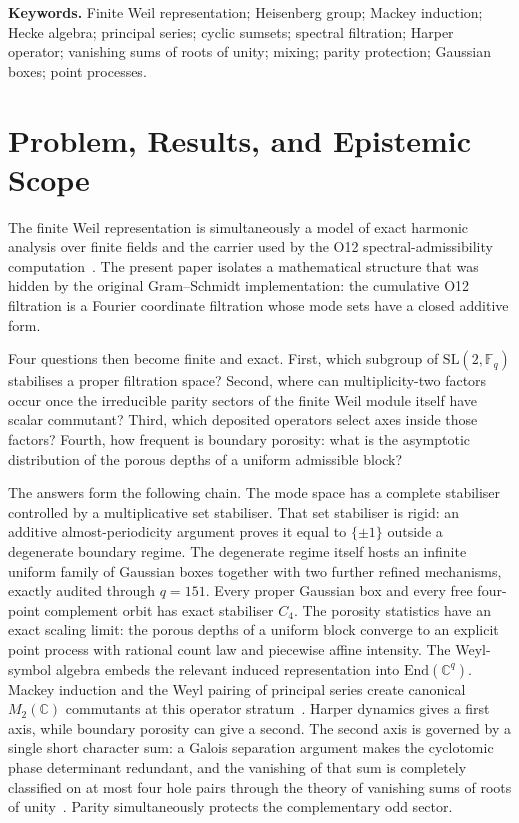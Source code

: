 \documentclass[11pt,a4paper]{article}
\theoremstyle{definition}
\theoremstyle{remark}
\newcommand{\C}{\mathbb{C}}
\newcommand{\Fq}{\mathbb{F}_q}
\newcommand{\G}{\mathrm{SL}(2,\Fq)}
\newcommand{\End}{\mathrm{End}}
\begin{document}
\noindent\textbf{Keywords.}
Finite Weil representation; Heisenberg group; Mackey induction; Hecke algebra;
principal series; cyclic sumsets; spectral filtration; Harper operator;
vanishing sums of roots of unity; mixing; parity protection; Gaussian boxes;
point processes.

\newpage
\tableofcontents

\newpage
\section{Problem, Results, and Epistemic Scope}
\label{sec:introduction}

The finite Weil representation is simultaneously a model of exact harmonic analysis over
finite fields and the carrier used by the O12 spectral-admissibility
computation~\cite{Weil1964,Gerardin1977,Beau2026a16}.
The present paper isolates a mathematical structure that was hidden by the original
Gram--Schmidt implementation: the cumulative O12 filtration is a Fourier coordinate
filtration whose mode sets have a closed additive form.

Four questions then become finite and exact.
First, which subgroup of $\G$ stabilises a proper filtration space?
Second, where can multiplicity-two factors occur once the irreducible parity sectors of the
finite Weil module itself have scalar commutant?
Third, which deposited operators select axes inside those factors?
Fourth, how frequent is boundary porosity: what is the asymptotic distribution of the
porous depths of a uniform admissible block?

The answers form the following chain.
The mode space has a complete stabiliser controlled by a multiplicative set stabiliser.
That set stabiliser is rigid: an additive almost-periodicity argument proves it equal to
$\{\pm1\}$ outside a degenerate boundary regime.
The degenerate regime itself hosts an infinite uniform family of Gaussian boxes together
with two further refined mechanisms, exactly audited through $q=151$.
Every proper Gaussian box and every free four-point complement orbit has exact stabiliser
$C_4$.
The porosity statistics have an exact scaling limit: the porous depths of a uniform block
converge to an explicit point process with rational count law and piecewise affine
intensity.
The Weyl-symbol algebra embeds the relevant induced representation into
$\End(\C^q)$.
Mackey induction and the Weyl pairing of principal series create canonical $M_2(\C)$
commutants at this operator stratum~\cite{Mackey1952,Iwahori1964}.
Harper dynamics gives a first axis, while boundary porosity can give a second.
The second axis is governed by a single short character sum: a Galois separation argument
makes the cyclotomic phase determinant redundant, and the vanishing of that sum is
completely classified on at most four hole pairs through the theory of vanishing sums of
roots of unity~\cite{LamLeung2000,ConwayJones1976}.
Parity simultaneously protects the complementary odd sector.
\end{document}
